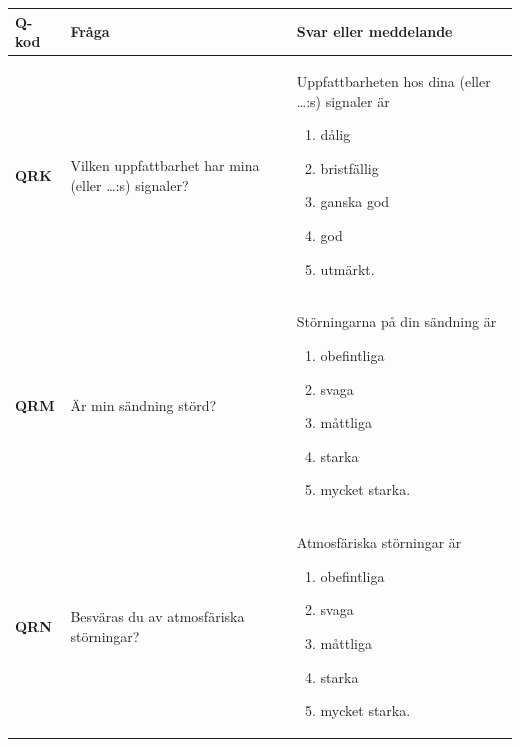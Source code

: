 \begin{table}
  \begin{threeparttable}
  \begin{tabular}{lp{6cm}p{6cm}}
    \textbf{Q-kod} & \textbf{Fråga} & \textbf{Svar eller meddelande} \\
    \hline
    \textbf{QRK} & Vilken uppfattbarhet har mina
                   (eller \dots:s)\tnote{*} signaler? &
                   Uppfattbarheten hos dina (eller \dots:s)\tnote{*} signaler är
                   \vspace{-\topsep}
                   \begin{enumerate}[noitemsep]
                       \item dålig
                       \item bristfällig
                       \item ganska god
                       \item god
                       \item utmärkt.
                   \end{enumerate} \\
    \textbf{QRM} & Är min sändning störd? &
                   Störningarna på din sändning är
                   \vspace{-\topsep}
                   \begin{enumerate}[noitemsep]
                       \item obefintliga
                       \item svaga
                       \item måttliga
                       \item starka
                       \item mycket starka.
                   \end{enumerate} \\
    \textbf{QRN} & Besväras du av atmosfäriska störningar? &
                   Atmosfäriska störningar är
                   \vspace{-\topsep}
                   \begin{enumerate}[noitemsep]
                       \item obefintliga
                       \item svaga
                       \item måttliga
                       \item starka
                       \item mycket starka.

\end{enumerate}
\end{tabular}
\end{threeparttable}
\end{table}
